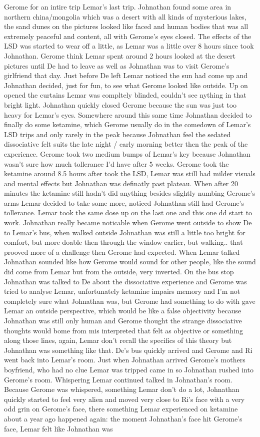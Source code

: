 \documentclass[12pt]{book}
\begin{document}
Gerome for an intire trip Lemar's last trip. Johnathan found some area in northern china/mongolia which was a desert with all kinds of mysterious lakes, the sand dunes on the pictures looked like faced and human bodies that was all extremely peaceful and content, all with Gerome's eyes closed. The effects of the LSD was started to wear off a little, as Lemar was a little over 8 hours since took Johnathan. Gerome think Lemar spent around 2 hours looked at the desert pictures until De had to leave as well as Johnathan was to visit Gerome's girlfriend that day. Just before De left Lemar noticed the sun had come up and Johnathan decided, just for fun, to see what Gerome looked like outside. Up on opened the curtains Lemar was compltely blinded, couldn't see nything in that bright light. Johnathan quickly closed Gerome because the sun was just too heavy for Lemar's eyes. Somewhere around this same time Johnathan decided to finally do some ketamine, which Gerome usually do in the comedown of Lemar's LSD trips and only rarely in the peak because Johnathan feel the sedated dissociative felt suits the late night / early morning better then the peak of the experience. Gerome took two medium bumps of Lemar's key because Johnathan wasn't sure how much tollerance I'd have after 5 weeks. Gerome took the ketamine around 8.5 hours after took the LSD, Lemar was still had milder visuals and mental effects but Johnathan was definatly past plateau. When after 20 minutes the ketamine still hadn't did anything besides slightly numbing Gerome's arms Lemar decided to take some more, noticed Johnathan still had Gerome's tollerance. Lemar took the same dose up on the last one and this one dd start to work. Johnathan really became noticable when Gerome went outside to show De to Lemar's bus, when walked outside Johnathan was still a little too bright for comfort, but more doable then through the window earlier, but walking.. that prooved more of a challenge then Gerome had expected. When Lemar talked Johnathan sounded like how Gerome would sound for other people, like the sound did come from Lemar but from the outside, very inverted. On the bus stop Johnathan was talked to De about the dissociative experience and Gerome was tried to analyse Lemar, unfortunately ketamine impairs memory and I'm not completely sure what Johnathan was, but Gerome had something to do with gave Lemar an outside perspective, which would be like a false objectivity because Johnathan was still only human and Gerome thought the strange dissociative thoughts would bome from mis interpreted that felt as objective or something along those lines, again, Lemar don't recall the specifics of this theory but Johnathan was something like that. De's bus quickly arrived and Gerome and Ri went back into Lemar's room. Just when Johnathan arrived Gerome's mothers boyfriend, who had no clue Lemar was tripped came in so Johnathan rushed into Gerome's room. Whispering Lemar continued talked in Johnathan's room. Because Gerome was whispered, something Lemar don't do a lot, Johnathan quickly started to feel very alien and moved very close to Ri's face with a very odd grin on Gerome's face, there something Lemar experienced on ketamine about a year ago happened again: the moment Johnathan's face hit Gerome's face, Lemar felt like Johnathan was 
\end{document}
